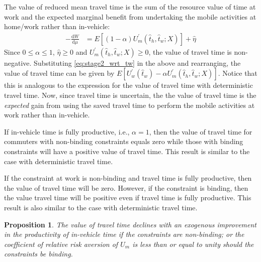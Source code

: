 \documentclass[12pt,a4paper,british]{article}
\newtheorem{prop}{Proposition}[section]
\begin{document}
The value of reduced mean travel time is the sum of the resource value of time at work and the expected marginal benefit from undertaking the mobile activities at home/work rather than in-vehicle:
\begin{align}
-\frac{\mathrm{d}W}{\mathrm{d}\mu} & = E\left[ \left( 1 - \alpha\right) U_m^{\prime} \left(\hat{t}_{h}, \hat{t}_{w}; X \right) \right] + \hat{\eta}
\label{eq:VOT_stochastic}
\end{align}
Since $0\leq \alpha \leq 1$, $\hat{\eta}\geq 0$ and $U_{m}^{\prime} \left( \hat{t}_{h}, \hat{t}_{w}; X\right) \geq 0$, the value of travel time is non-negative. Substituting \eqref{eq:stage2_wrt_tw} in the above and rearranging, the value of travel time can be given by $E\left[ U_{w}^{\prime}\left( \hat{t}_{w} \right) - \alpha U_{m}^{\prime}\left(\hat{t}_{h}, \hat{t}_{w}; X\right)\right]$.  Notice that this is analogous to the expression for the value of travel time with deterministic travel time. Now, since travel time is uncertain, the the value of travel time is the \textit{expected} gain from using the saved travel time to perform the mobile activities at work rather than in-vehicle.

If in-vehicle time is fully productive, i.e., $\alpha=1$,  then the value of travel time for commuters with non-binding constraints equals zero while those with binding constraints will have a positive value of travel time. This result is similar to the case with deterministic travel time. %

If the constraint at work is non-binding and travel time is fully productive, then the value of travel time will be zero. However, if the constraint is binding, then the value travel time will be positive even if travel time is fully productive. This result is also similar to the case with deterministic travel time.

\begin{prop}
The value of travel time declines with an exogenous improvement in the productivity of in-vehicle time if the constraints are non-binding; or the coefficient of relative risk aversion of $U_m$ is less than or equal to unity should the constraints be binding.
\end{prop}
\end{document}
